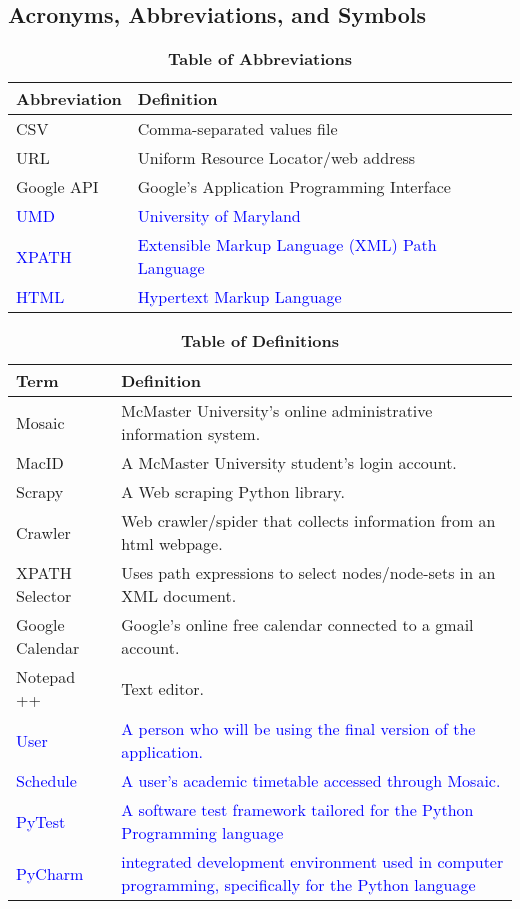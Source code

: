 \documentclass[12pt, titlepage]{article}
\begin{document}
\subsection{Acronyms, Abbreviations, and Symbols}
	
\begin{table}[hbp]
\caption{\textbf{Table of Abbreviations}} \label{Table}

\begin{tabularx}{\textwidth}{p{3cm}X}
\toprule
\textbf{Abbreviation} & \textbf{Definition} \\
\midrule
CSV & Comma-separated values file\\
URL & Uniform Resource Locator/web address\\
Google API & Google’s Application Programming Interface\\
\textcolor{blue}{UMD} & \textcolor{blue}{University of Maryland}\\
\textcolor{blue}{XPATH} & \textcolor{blue}{Extensible Markup Language (XML) Path Language}\\
\textcolor{blue}{HTML} & \textcolor{blue}{Hypertext Markup Language}\\
\bottomrule
\end{tabularx}

\end{table}
\begin{table}[!htbp]
\caption{\textbf{Table of Definitions}} \label{Table}
\begin{tabularx}{\textwidth}{p{3cm}X}
\toprule
\textbf{Term} & \textbf{Definition}\\
\midrule
Mosaic & McMaster University's online administrative information system.\\
MacID & A McMaster University student's login account.\\
Scrapy & A Web scraping Python library.\\
Crawler & Web crawler/spider that collects information from an html webpage.\\
XPATH Selector & Uses path expressions to select nodes/node-sets in an XML document. \\
Google Calendar & Google’s online free calendar connected to a gmail account.\\
Notepad ++ & Text editor.\\
\textcolor{blue}
{User} & \textcolor{blue}{A person who will be using the final version of the application.} \\
\textcolor{blue}
{Schedule} & \textcolor{blue}
{ A user's academic timetable accessed through Mosaic.}\\
\textcolor{blue}
{PyTest} & \textcolor{blue}
{A software test framework tailored for the Python Programming language}\\
\textcolor{blue}{PyCharm} & \textcolor{blue}{integrated development environment used in computer programming, specifically for the Python language}\\
\bottomrule
\end{tabularx}

\end{table}	
\end{document}
